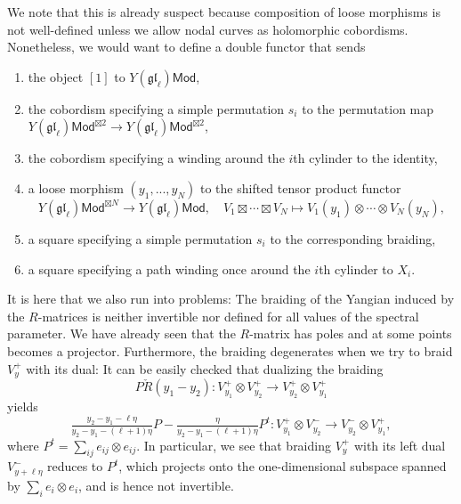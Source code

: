 \documentclass[11pt]{report}
\theoremstyle{definition}
\theoremstyle{remark}
\theoremstyle{remark}
\begin{document}
We note that this is already suspect because composition of loose morphisms is not well-defined unless we allow nodal curves as holomorphic cobordisms. Nonetheless, we would want to define a double functor that sends
\begin{enumerate}[label=(\roman*)]
\item the object $[1]$ to $Y(\mathfrak{gl}_\ell)\mathsf{Mod}$,
\item the cobordism specifying a simple permutation $s_i$ to the permutation map $Y(\mathfrak{gl}_\ell)\mathsf{Mod}^{\boxtimes 2} \to Y(\mathfrak{gl}_\ell)\mathsf{Mod}^{\boxtimes 2}$,
\item the cobordism specifying a winding around the $i$th cylinder to the identity,
\item a loose morphism $(y_1,...,y_N)$ to the shifted tensor product functor
\begin{equation*}
Y(\mathfrak{gl}_\ell)\mathsf{Mod}^{\boxtimes N} \to Y(\mathfrak{gl}_\ell)\mathsf{Mod}, \quad V_1 \boxtimes \cdots \boxtimes V_N \mapsto V_1(y_1) \otimes \cdots \otimes V_N(y_N),
\end{equation*}
\item a square specifying a simple permutation $s_i$ to the corresponding braiding,
\item a square specifying a path winding once around the $i$th cylinder to $X_i$.
\end{enumerate}
It is here that we also run into problems: The braiding of the Yangian induced by the $R$-matrices is neither invertible nor defined for all values of the spectral parameter. We have already seen that the $R$-matrix has poles and at some points becomes a projector. Furthermore, the braiding degenerates when we try to braid $V_y^+$ with its dual: It can be easily checked that dualizing the braiding
\begin{equation*}
P \check R(y_1-y_2): V_{y_1}^+ \otimes V_{y_2}^+ \to V_{y_2}^+ \otimes V_{y_1}^+
\end{equation*}
yields
\begin{equation*}
\tfrac{y_2-y_1-\ell\eta}{y_2-y_1-(\ell+1)\eta} P - \tfrac{\eta}{y_2-y_1-(\ell+1)\eta} P^t: V_{y_1}^+ \otimes V_{y_2}^- \to V_{y_2}^- \otimes V_{y_1}^+,
\end{equation*}
where $P^t = \sum_{ij} e_{ij} \otimes e_{ij}$. In particular, we see that braiding $V_y^+$ with its left dual $V_{y+\ell\eta}^-$ reduces to $P^t$, which projects onto the one-dimensional subspace spanned by $\sum_i e_i \otimes e_i$, and is hence not invertible.
\end{document}
